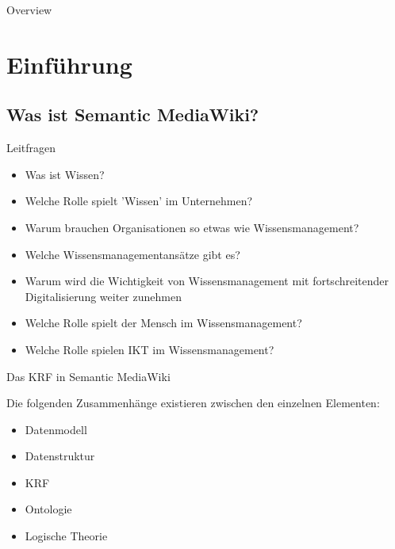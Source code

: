 \documentclass[aspectratio=1610,onlymath]{beamer}
\begin{document}
\maketitle


\begin{frame}{Overview}
\tableofcontents
\end{frame}



%
%

\section{Einführung}
\subsection{Was ist Semantic MediaWiki? } %
\label{sub:was_ist_semantic_mediawiki}


\begin{frame}{Leitfragen}
\begin{itemize}
	\item Was ist Wissen?
	\item Welche Rolle spielt 'Wissen' im Unternehmen?
	\item Warum brauchen Organisationen so etwas wie Wissensmanagement?
	\item Welche Wissensmanagementansätze gibt es?
	\item Warum wird die Wichtigkeit von Wissensmanagement mit fortschreitender Digitalisierung weiter zunehmen
	\item Welche Rolle spielt der Mensch im Wissensmanagement?
	\item Welche Rolle spielen IKT im Wissensmanagement?
\end{itemize}
\end{frame}

\begin{frame}{Das KRF in Semantic MediaWiki}

Die folgenden Zusammenhänge existieren zwischen den einzelnen Elementen:
\begin{itemize}
	\item Datenmodell
	\item Datenstruktur
	\item KRF
	\item Ontologie
	\item Logische Theorie 
\end{itemize}

\end{frame}
\end{document}
